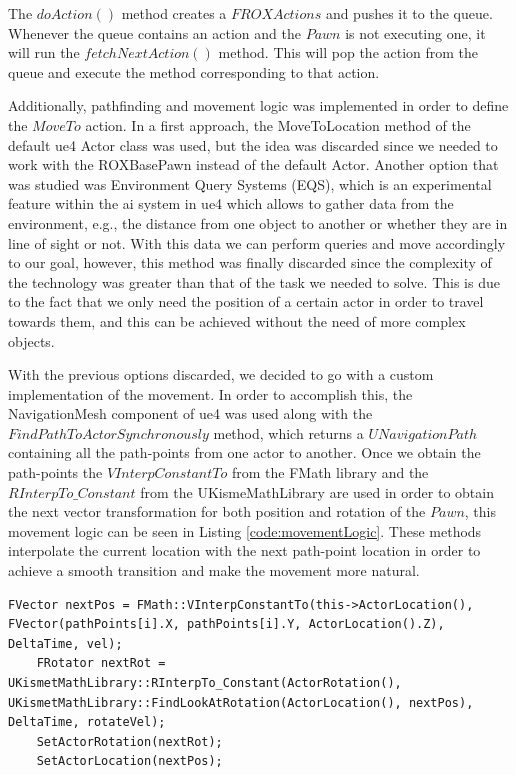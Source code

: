 The $doAction()$ method creates a $FROXActions$ and pushes it to the queue. Whenever the queue contains an action and the $Pawn$ is not executing one, it will run the $fetchNextAction()$ method. This will pop the action from the queue and execute the method corresponding to that action.

Additionally, pathfinding and movement logic was implemented in order to define the $MoveTo$ action. In a first approach, the MoveToLocation method of the default \gls{ue4} Actor class was used, but the idea was discarded since we needed to work with the ROXBasePawn instead of the default Actor. Another option that was studied was Environment Query Systems (EQS), which is an experimental feature within the \gls{ai} system in \gls{ue4} which allows to gather data from the environment, e.g., the distance from one object to another or whether they are in line of sight or not. With this data we can perform queries and move accordingly to our goal, however, this method was finally discarded since the complexity of the technology was greater than that of the task we needed to solve. This is due to the fact that we only need the position of a certain actor in order to travel towards them, and this can be achieved without the need of more complex objects. 

With the previous options discarded, we decided to go with a custom implementation of the movement. In order to accomplish this, the NavigationMesh component of \gls{ue4} was used along with the $FindPathToActorSynchronously$ method, which returns a $UNavigationPath$ containing all the path-points from one actor to another. Once we obtain the path-points the $VInterpConstantTo$ from the FMath library and the $RInterpTo\_Constant$ from the UKismeMathLibrary are used in order to obtain the next vector transformation for both position and rotation of the $Pawn$, this movement logic can be seen in Listing \ref{code:movementLogic}. These methods interpolate the current location with the next path-point location in order to achieve a smooth transition and make the movement more natural.

\begin{lstlisting}[style=C++, caption=Movement logic for the pathfinding algorithm, frame=single, label=code:movementLogic]
	FVector nextPos = FMath::VInterpConstantTo(this->ActorLocation(), FVector(pathPoints[i].X, pathPoints[i].Y, ActorLocation().Z), DeltaTime, vel);
	FRotator nextRot = UKismetMathLibrary::RInterpTo_Constant(ActorRotation(), UKismetMathLibrary::FindLookAtRotation(ActorLocation(), nextPos), DeltaTime, rotateVel);
	SetActorRotation(nextRot);
	SetActorLocation(nextPos);
\end{lstlisting}

